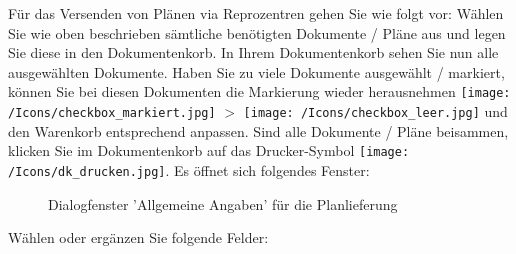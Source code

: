 \vspace{\baselineskip}

Für das Versenden von Plänen via Reprozentren gehen Sie wie folgt vor: Wählen Sie wie oben beschrieben sämtliche benötigten Dokumente / Pläne aus und legen Sie diese in den Dokumentenkorb. In Ihrem Dokumentenkorb sehen Sie nun alle ausgewählten Dokumente. Haben Sie zu viele Dokumente ausgewählt / markiert, können Sie bei diesen Dokumenten die Markierung wieder herausnehmen \texttt{[image: /Icons/checkbox\_markiert.jpg]} $ > $ \texttt{[image: /Icons/checkbox\_leer.jpg]} und den Warenkorb entsprechend anpassen. Sind alle Dokumente / Pläne beisammen, klicken Sie im Dokumentenkorb auf das Drucker-Symbol \texttt{[image: /Icons/dk\_drucken.jpg]}. Es öffnet sich folgendes Fenster:

\begin{figure}[H]
\caption{Dialogfenster 'Allgemeine Angaben' für die Planlieferung}
\end{figure}

Wählen oder ergänzen Sie folgende Felder:

